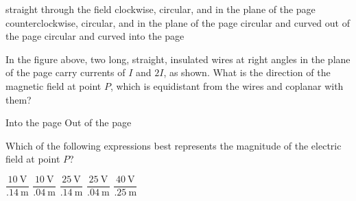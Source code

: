 \documentclass[12pt]{../oss-classkick-exam}
\begin{document}
\begin{questions}
  \vspace{.1in}
  \begin{minipage}{.4\linewidth}
  \end{minipage}
  \begin{minipage}{.55\linewidth}
    \begin{choices}
      \choice straight through the field
      \choice clockwise, circular, and in the plane of the page
      \choice counterclockwise, circular, and in the plane of the page
      \choice circular and curved out of the page
      \choice circular and curved into the page
    \end{choices}
  \end{minipage}
  \vspace{.6in}
  
  \question In the figure above, two long, straight, insulated wires at right
  angles in the plane of the page carry currents of $I$ and $2I$, as shown.
  What is the direction of the magnetic field at point $P$, which is
  equidistant from the wires and coplanar with them?
  \begin{choices}
    \choice Into the page
    \choice Out of the page
    \choice {\huge$\searrow$}
    \choice {\huge$\nwarrow$}
    \choice {\huge$\nearrow$}
  \end{choices}
  
  \question Which of the following expressions best represents the magnitude of
  the electric field at point $P$?
  \label{contour1}
  \begin{choices}
    \choice $\dfrac{\SI{10}{\volt}}{\SI{.14}{\metre}}$
    \choice $\dfrac{\SI{10}{\volt}}{\SI{.04}{\metre}}$
    \choice $\dfrac{\SI{25}{\volt}}{\SI{.14}{\metre}}$
    \choice $\dfrac{\SI{25}{\volt}}{\SI{.04}{\metre}}$
    \choice $\dfrac{\SI{40}{\volt}}{\SI{.25}{\metre}}$
  \end{choices}


\end{questions}
\end{document}
